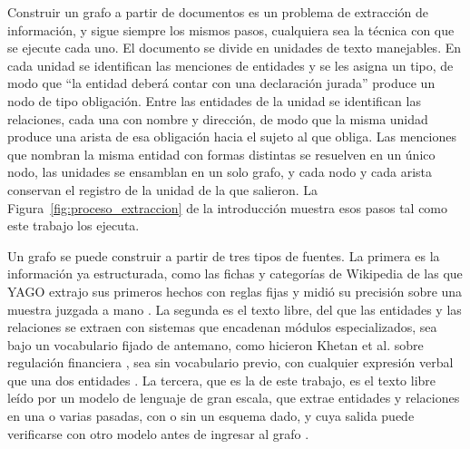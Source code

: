 \documentclass[12pt,a4paper]{report}
\begin{document}
Construir un grafo a partir de documentos es un problema de extracción de información, y sigue siempre los mismos pasos, cualquiera sea la técnica con que se ejecute cada uno. El documento se divide en unidades de texto manejables. En cada unidad se identifican las menciones de entidades y se les asigna un tipo, de modo que \enquote{la entidad deberá contar con una declaración jurada} produce un nodo de tipo obligación. Entre las entidades de la unidad se identifican las relaciones, cada una con nombre y dirección, de modo que la misma unidad produce una arista de esa obligación hacia el sujeto al que obliga. Las menciones que nombran la misma entidad con formas distintas se resuelven en un único nodo, las unidades se ensamblan en un solo grafo, y cada nodo y cada arista conservan el registro de la unidad de la que salieron. La Figura~\ref{fig:proceso_extraccion} de la introducción muestra esos pasos tal como este trabajo los ejecuta.

Un grafo se puede construir a partir de tres tipos de fuentes. La primera es la información ya estructurada, como las fichas y categorías de Wikipedia de las que YAGO extrajo sus primeros hechos con reglas fijas y midió su precisión sobre una muestra juzgada a mano \cite{suchanek2007yago}. La segunda es el texto libre, del que las entidades y las relaciones se extraen con sistemas que encadenan módulos especializados, sea bajo un vocabulario fijado de antemano, como hicieron Khetan et al. sobre regulación financiera \cite{khetan2021kganchored}, sea sin vocabulario previo, con cualquier expresión verbal que una dos entidades \cite{etzioni2011open,delcorro2013clausie}. La tercera, que es la de este trabajo, es el texto libre leído por un modelo de lenguaje de gran escala, que extrae entidades y relaciones en una o varias pasadas, con o sin un esquema dado, y cuya salida puede verificarse con otro modelo antes de ingresar al grafo \cite{carta2023iterative,lu2025karma}.
\end{document}
